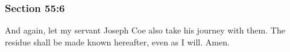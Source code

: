	\subsubsection{Section 55:6} %
		\label{DC55-6}

		And again, let my servant Joseph Coe also take his journey with them.  The residue shall be made known hereafter, even as I will.  Amen.

